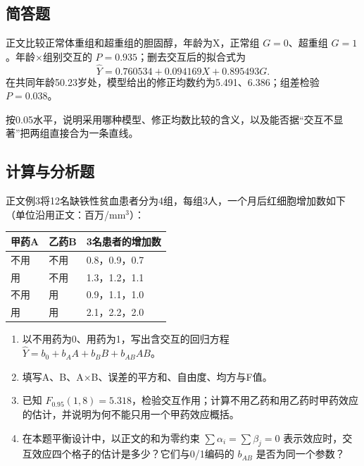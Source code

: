 \subsection{简答题}

\par\addvspace{6pt}\noindent\begin{minipage}{\linewidth}


正文比较正常体重组和超重组的胆固醇，年龄为X，正常组 \(G=0\)、超重组 \(G=1\)。年龄×组别交互的 \(P=0.935\)；删去交互后的拟合式为 \[\hat Y=0.760534+0.094169X+0.895493G.\] 在共同年龄50.23岁处，模型给出的修正均数约为5.491、6.386；组差检验 \(P=0.038\)。

按0.05水平，说明采用哪种模型、修正均数比较的含义，以及能否据``交互不显著''把两组直接合为一条直线。



\end{minipage}\par\vspace{4pt}

\subsection{计算与分析题}


正文例3将12名缺铁性贫血患者分为4组，每组3人，一个月后红细胞增加数如下（单位沿用正文：百万/mm\(^3\)）：

\begin{center}\small\setlength{\tabcolsep}{5pt}\renewcommand{\arraystretch}{1.18}\begin{tabular}{@{}lll@{}}
\toprule
甲药A & 乙药B & 3名患者的增加数 \\
\midrule

不用 & 不用 & 0.8，0.9，0.7 \\
用 & 不用 & 1.3，1.2，1.1 \\
不用 & 用 & 0.9，1.1，1.0 \\
用 & 用 & 2.1，2.2，2.0 \\
\bottomrule\end{tabular}\end{center}

\begin{enumerate}
\def\labelenumi{\arabic{enumi}.}
\tightlist
\item
  以不用药为0、用药为1，写出含交互的回归方程 \(\hat Y=b_0+b_AA+b_BB+b_{AB}AB\)。
\item
  填写A、B、A×B、误差的平方和、自由度、均方与F值。
\item
  已知 \(F_{0.95}(1,8)=5.318\)，检验交互作用；计算不用乙药和用乙药时甲药效应的估计，并说明为何不能只用一个甲药效应概括。
\item
  在本题平衡设计中，以正文的和为零约束 \(\sum\alpha_i=\sum\beta_j=0\) 表示效应时，交互效应四个格子的估计是多少？它们与0/1编码的 \(b_{AB}\) 是否为同一个参数？
\end{enumerate}


